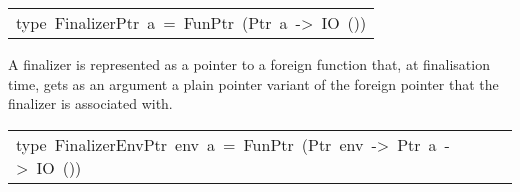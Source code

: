 \begin{haddockdesc}
\item[\begin{tabular}{@{}l}
type\ FinalizerPtr\ a\ =\ FunPtr\ (Ptr\ a\ ->\ IO\ ())
\end{tabular}]\haddockbegindoc
A finalizer is represented as a pointer to a foreign function that, at
 finalisation time, gets as an argument a plain pointer variant of the
 foreign pointer that the finalizer is associated with.
\par

\end{haddockdesc}
\begin{haddockdesc}
\item[\begin{tabular}{@{}l}
type\ FinalizerEnvPtr\ env\ a\ =\ FunPtr\ (Ptr\ env\ ->\ Ptr\ a\ ->\ IO\ ())
\end{tabular}]
\end{haddockdesc}
